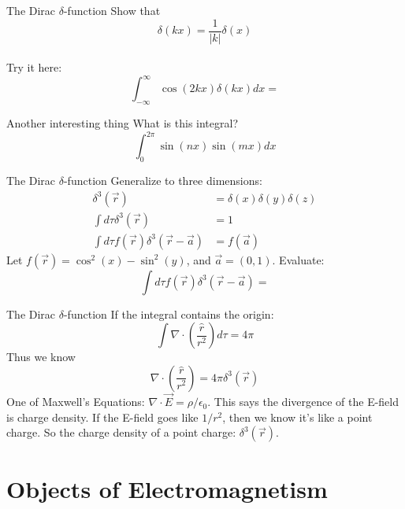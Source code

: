 \documentclass{beamer}
\begin{document}
\begin{frame}{The Dirac $\delta$-function}
Show that
\begin{equation}
\delta(kx) = \frac{1}{|k|}\delta(x)
\end{equation} \\ \vspace{2cm}
Try it here:
\begin{equation}
\int_{-\infty}^{\infty} \cos(2kx) \delta(kx) dx = 
\end{equation}
\end{frame}

\begin{frame}{Another interesting thing}
What is this integral?
\begin{equation}
\int_0^{2\pi} \sin(nx)\sin(mx) dx
\end{equation}
\end{frame}

\begin{frame}{The Dirac $\delta$-function}
Generalize to three dimensions:
\begin{align}
\delta^3(\vec{r}) &= \delta(x) \delta(y) \delta(z) \\
\int d\tau \delta^3(\vec{r}) &= 1 \\
\int d\tau f(\vec{r})\delta^3(\vec{r}-\vec{a}) &= f(\vec{a})
\end{align}
Let $f(\vec{r}) = \cos^2(x) - \sin^2(y)$, and $\vec{a} = (0,1)$.  Evaluate:
\begin{equation}
\int d\tau f(\vec{r})\delta^3(\vec{r}-\vec{a}) = 
\end{equation}
\end{frame}

\begin{frame}{The Dirac $\delta$-function}
If the integral contains the origin:
\begin{equation}
\int \nabla \cdot \left(\frac{\hat{r}}{r^2}\right) d\tau = 4\pi
\end{equation}
Thus we know
\begin{equation}
\nabla \cdot \left(\frac{\hat{r}}{r^2}\right) =  4\pi \delta^3(\vec{r})
\end{equation}
One of Maxwell's Equations: $\nabla \cdot \vec{E} = \rho/\epsilon_0$.  This says the divergence of the E-field is charge density.  If the E-field goes like $1/r^2$, then we know it's like a point charge.  So the charge density of a point charge: $\delta^3(\vec{r})$.
\end{frame}

\section{Objects of Electromagnetism}
\end{document}

